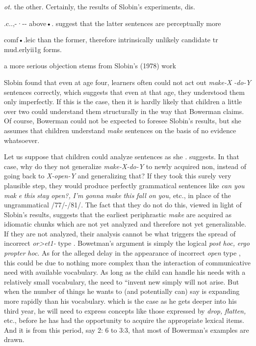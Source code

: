 \textit{ot.} the other. Certainly, the results of Slobin's experiments, dis.

.c..,-·-{}- above•. suggest that the latter sentences are perceptually more

comf•.leic than the former, therefore intrinsically unlikely candidate tr mud.erlyii1g forms.

a more serious objection stems from Slobin's (1978) work


Slobin found that even at age four,  learners often could not act out \textit{make-X} \textit{{}-do-Y} sentences correctly, which suggests that even at that age, they understood them only imperfectly. If this is the case, then it is hardly likely that children a little over two could understand them structurally in the way that Bowerman claims. Of course, Bower\-man could not be expected to foresee Slobin's results, but she assumes that children understand \textit{make} sentences on the basis of no evidence whatsoever.

Let us suppose that children could analyze sentences as she . suggests. In that case, why do they not generalize \textit{make-X-do-Y }to newly acquired non, instead of going back to \textit{X-open-Y} and generalizing that? If they took this surely very plausible step, they would produce perfectly grammatical sentences like \textit{can you} \textit{mak} \textit{e} \textit{this} \textit{stay} \textit{open?,} \textit{I'm} \textit{gonna} \textit{make} \textit{this} \textit{fall on} \textit{you,} etc., in place of the ungrammatical /77/-/81/. The fact that they do not do this, viewed in light of Slobin's results, suggests that the earliest periphrastic \textit{make } are acquired as idiomatic chunks which are not yet analyzed and therefore not yet generalizable. If they are not analyzed, their analysis cannot be what triggers the spread of incorrect \textit{or{\textgreater}et1-} type . Bowetman's argument is simply the logical
\textit{post} \textit{hoc,} \textit{ergo} \textit{propter} \textit{hoc}. 
As for the alleged delay in the appearance of incorrect \textit{open\-} type , this could be due to nothing more complex than the interaction of communicative need with available vocabulary. As long as the child can handle his needs with a relatively small vocabulary, the need to ``invent new  simply will not arise. But when the number of things he wants to (and potentially can) say is expanding more rapidly than his vocabulary. which is the case as he gets deeper into his third year, he will need to express concepts like those expressed by \textit{drop,} \textit{flatten,} etc., before he has had the opportunity to acquire the appropriate lexical items. And it is from this period, say 2: 6 to 3:3, that most of Bowerman's examples are drawn.

